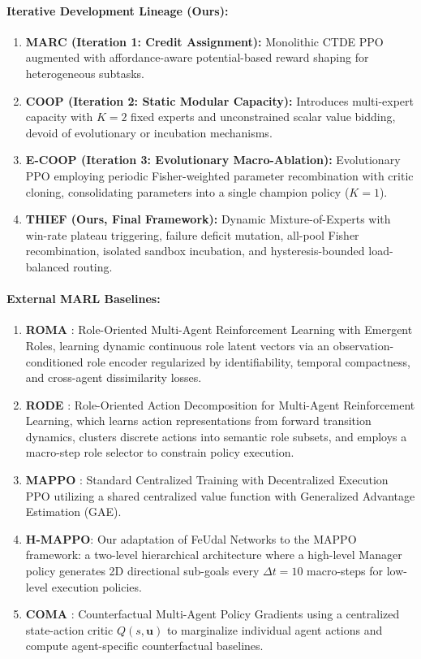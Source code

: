 \paragraph{Iterative Development Lineage (Ours):}
\begin{enumerate}[leftmargin=*,nosep]
    \item \textbf{MARC (Iteration 1: Credit Assignment):} Monolithic CTDE PPO augmented with affordance-aware potential-based reward shaping for heterogeneous subtasks.
    \item \textbf{COOP (Iteration 2: Static Modular Capacity):} Introduces multi-expert capacity with $K=2$ fixed experts and unconstrained scalar value bidding, devoid of evolutionary or incubation mechanisms.
    \item \textbf{E-COOP (Iteration 3: Evolutionary Macro-Ablation):} Evolutionary PPO employing periodic Fisher-weighted parameter recombination with critic cloning, consolidating parameters into a single champion policy ($K=1$).
    \item \textbf{THIEF (Ours, Final Framework):} Dynamic Mixture-of-Experts with win-rate plateau triggering, failure deficit mutation, all-pool Fisher recombination, isolated sandbox incubation, and hysteresis-bounded load-balanced routing.
\end{enumerate}

\paragraph{External MARL Baselines:}
\begin{enumerate}[leftmargin=*,nosep]
    \item \textbf{ROMA} \citep{wang2020roma}: Role-Oriented Multi-Agent Reinforcement Learning with Emergent Roles, learning dynamic continuous role latent vectors via an observation-conditioned role encoder regularized by identifiability, temporal compactness, and cross-agent dissimilarity losses.
    \item \textbf{RODE} \citep{wang2021rode}: Role-Oriented Action Decomposition for Multi-Agent Reinforcement Learning, which learns action representations from forward transition dynamics, clusters discrete actions into semantic role subsets, and employs a macro-step role selector to constrain policy execution.
    \item \textbf{MAPPO} \citep{yu2022surprising}: Standard Centralized Training with Decentralized Execution PPO utilizing a shared centralized value function with Generalized Advantage Estimation (GAE).
    \item \textbf{H-MAPPO}: Our adaptation of FeUdal Networks \citep{vezhnevets2017feudal} to the MAPPO \citep{yu2022surprising} framework: a two-level hierarchical architecture where a high-level Manager policy generates 2D directional sub-goals every $\Delta t = 10$ macro-steps for low-level execution policies.
    \item \textbf{COMA} \citep{foerster2018counterfactual}: Counterfactual Multi-Agent Policy Gradients using a centralized state-action critic $Q(s, \mathbf{u})$ to marginalize individual agent actions and compute agent-specific counterfactual baselines.
\end{enumerate}

